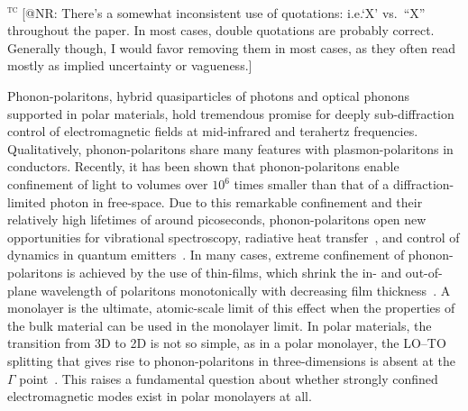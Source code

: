 \documentclass[aps,prb,twocolumn,
	           groupedaddress,superscriptaddress,
               amsfonts,amssymb,amsmath,floatfix,
	           citeautoscript]{revtex4-1}
\makeatletter
\newcommand{\ie}{i.e.\@\xspace} %
\newcommand{\comment}[2]{%
    \ifbool{togglecomments}%
    {\textcolor{blue!70!black}{\small\textsf{%
    \textsuperscript{\textsc{\textsf{\MakeLowercase{#1}}}}%
    [#2]}}} %
    {}}     %
\makeatother
\begin{document}
\comment{tc}{@NR: There's a somewhat inconsistent use of quotations: \ie `X' vs.\ ``X'' throughout the paper. In most cases, double quotations are probably correct. Generally though, I would favor removing them in most cases, as they often read mostly as implied uncertainty or vagueness.}

Phonon-polaritons, hybrid quasiparticles of photons and optical phonons supported in polar materials, hold tremendous promise for deeply sub-diffraction control of electromagnetic fields at mid-infrared and terahertz frequencies. Qualitatively, phonon-polaritons share many features with plasmon-polaritons in conductors. Recently, it has been shown that phonon-polaritons enable confinement of light to volumes over $10^6$ times smaller than that of a diffraction-limited photon in free-space\cite{caldwell2013low,xu2014mid,caldwell2014sub,dai2014tunable,tomadin2015accessing,yoxall2015direct,li2015hyperbolic,dai2015subdiffractional,dai2015graphene,caldwell2015low,li2016reversible,Basov:2016,basov2017towards,low2017polaritons,giles2017ultra,li2018infrared,ma2018plane}. Due to this remarkable confinement and their relatively high lifetimes of around picoseconds, phonon-polaritons open new opportunities for vibrational spectroscopy,\cite{autore2018boron} radiative heat transfer~\cite{hillenbrand2002phonon}, and control of dynamics in quantum emitters~\cite{kumar2015tunable,rivera2017making,kurman2018control}. 
In many cases, extreme confinement of phonon-polaritons is achieved by the use of thin-films, which shrink the in- and out-of-plane wavelength of polaritons monotonically with decreasing film thickness~\cite{dai2014tunable,dubrovkin2018ultra}. A monolayer is the ultimate, atomic-scale limit of this effect when the properties of the bulk material can be used in the monolayer limit. In polar materials, the transition from 3D to 2D is not so simple, as in a polar monolayer, the LO--TO splitting that gives rise to phonon-polaritons in three-dimensions is absent at the $\Gamma$ point~\cite{sanchez2002vibrational,mele2002electric,serrano2007vibrational,sohier2017breakdown}. This raises a fundamental question about whether strongly confined electromagnetic modes exist in polar monolayers at all. 
\end{document}
